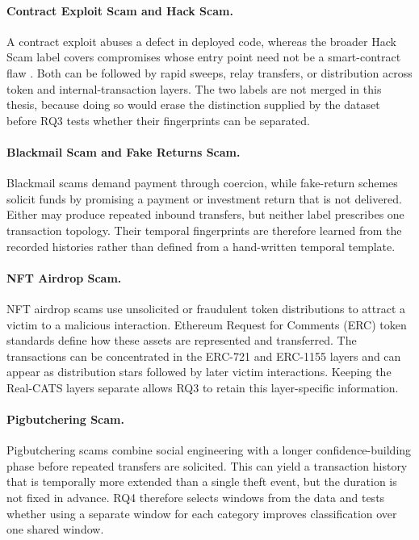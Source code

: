 \paragraph{Contract Exploit Scam and Hack Scam.}
A contract exploit abuses a defect in deployed code, whereas the broader Hack Scam
label covers compromises whose entry point need not be a smart-contract flaw
\citep{shi2025realcats}. Both can be followed by rapid sweeps, relay transfers, or
distribution across token and internal-transaction layers. The two labels are not
merged in this thesis, because doing so would erase the distinction supplied by the
dataset before RQ3 tests whether their fingerprints can be separated.

\paragraph{Blackmail Scam and Fake Returns Scam.}
Blackmail scams demand payment through coercion, while fake-return schemes solicit
funds by promising a payment or investment return that is not delivered. Either may
produce repeated inbound transfers, but neither label prescribes one transaction
topology. Their temporal fingerprints are therefore learned from the recorded
histories rather than defined from a hand-written temporal template.

\paragraph{NFT Airdrop Scam.}
NFT airdrop scams use unsolicited or fraudulent token distributions to attract a
victim to a malicious interaction. Ethereum Request for Comments (ERC) token
standards define how these assets are represented and transferred. The
transactions can be concentrated in the ERC-721 and ERC-1155 layers and can
appear as distribution stars followed by later
victim interactions. Keeping the Real-CATS layers separate allows RQ3 to retain
this layer-specific information.

\paragraph{Pigbutchering Scam.}
Pigbutchering scams combine social engineering with a longer confidence-building
phase before repeated transfers are solicited. This can yield a transaction history
that is temporally more extended than a single theft event, but the duration is not
fixed in advance. RQ4 therefore selects windows from the data and tests whether
using a separate window for each category improves classification over one shared
window.

